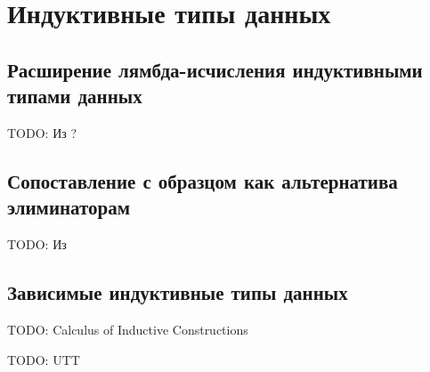 \section{Индуктивные типы данных}

\subsection{Расширение лямбда-исчисления индуктивными типами данных}

TODO: Из \cite{tapl} ?

\subsection{Сопоставление с образцом как альтернатива элиминаторам}

TODO: Из \cite{proving-properties-of-programs-by-structural-induction}

\subsection{Зависимые индуктивные типы данных}

TODO: Calculus of Inductive Constructions

TODO: UTT
